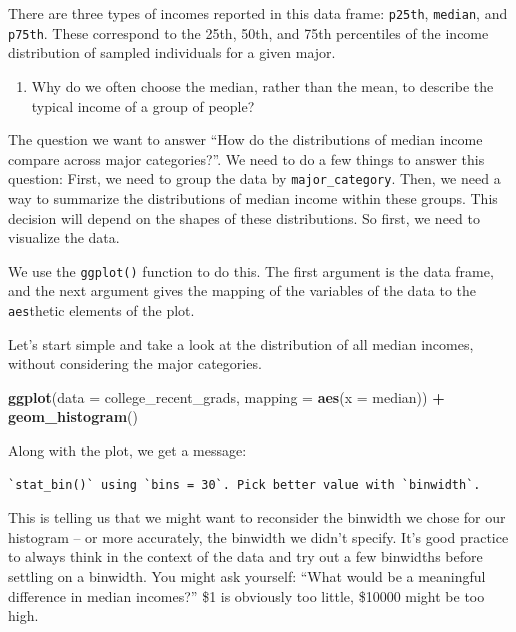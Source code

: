 \documentclass[
]{article}
\newenvironment{Shaded}{\begin{snugshade}}{\end{snugshade}}
\newcommand{\AttributeTok}[1]{\textcolor[rgb]{0.13,0.29,0.53}{#1}}
\newcommand{\FunctionTok}[1]{\textcolor[rgb]{0.13,0.29,0.53}{\textbf{#1}}}
\newcommand{\NormalTok}[1]{#1}
\newcommand{\SpecialCharTok}[1]{\textcolor[rgb]{0.81,0.36,0.00}{\textbf{#1}}}
\providecommand{\tightlist}{%
  \setlength{\itemsep}{0pt}\setlength{\parskip}{0pt}}
\begin{document}
There are three types of incomes reported in this data frame:
\texttt{p25th}, \texttt{median}, and \texttt{p75th}. These correspond to
the 25th, 50th, and 75th percentiles of the income distribution of
sampled individuals for a given major.

\begin{enumerate}
\def\labelenumi{\arabic{enumi}.}
\setcounter{enumi}{1}
\tightlist
\item
  Why do we often choose the median, rather than the mean, to describe
  the typical income of a group of people?
\end{enumerate}

The question we want to answer ``How do the distributions of median
income compare across major categories?''. We need to do a few things to
answer this question: First, we need to group the data by
\texttt{major\_category}. Then, we need a way to summarize the
distributions of median income within these groups. This decision will
depend on the shapes of these distributions. So first, we need to
visualize the data.

We use the \texttt{ggplot()} function to do this. The first argument is
the data frame, and the next argument gives the mapping of the variables
of the data to the \texttt{aes}thetic elements of the plot.

Let's start simple and take a look at the distribution of all median
incomes, without considering the major categories.

\begin{Shaded}
\begin{Highlighting}[]
\FunctionTok{ggplot}\NormalTok{(}\AttributeTok{data =}\NormalTok{ college\_recent\_grads, }\AttributeTok{mapping =} \FunctionTok{aes}\NormalTok{(}\AttributeTok{x =}\NormalTok{ median)) }\SpecialCharTok{+}
  \FunctionTok{geom\_histogram}\NormalTok{()}
\end{Highlighting}
\end{Shaded}

Along with the plot, we get a message:

\begin{verbatim}
`stat_bin()` using `bins = 30`. Pick better value with `binwidth`.
\end{verbatim}

This is telling us that we might want to reconsider the binwidth we
chose for our histogram -- or more accurately, the binwidth we didn't
specify. It's good practice to always think in the context of the data
and try out a few binwidths before settling on a binwidth. You might ask
yourself: ``What would be a meaningful difference in median incomes?''
\$1 is obviously too little, \$10000 might be too high.
\end{document}

